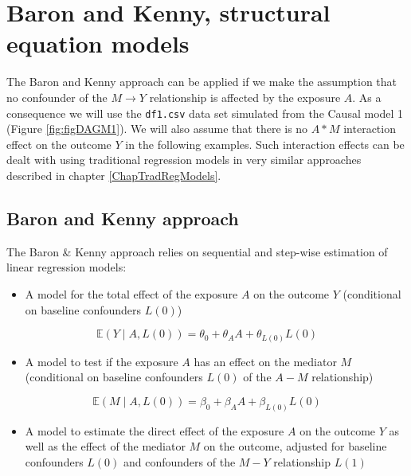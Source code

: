 \documentclass[
]{book}
\providecommand{\tightlist}{%
  \setlength{\itemsep}{0pt}\setlength{\parskip}{0pt}}
\begin{document}
\chapter{Baron and Kenny, structural equation models}\label{ChapBaronKennySem}

The Baron and Kenny approach can be applied if we make the assumption that no confounder of the \(M \rightarrow Y\) relationship is affected by the exposure \(A\). As a consequence we will use the \texttt{df1.csv} data set simulated from the Causal model 1 (Figure \ref{fig:figDAGM1}). We will also assume that there is no \(A \ast M\) interaction effect on the outcome \(Y\) in the following examples. Such interaction effects can be dealt with using traditional regression models in very similar approaches described in chapter \ref{ChapTradRegModels}.

\section{Baron and Kenny approach}\label{baron-and-kenny-approach}

The Baron \& Kenny approach relies on sequential and step-wise estimation of linear regression models:

\begin{itemize}
\tightlist
\item
  A model for the total effect of the exposure \(A\) on the outcome \(Y\) (conditional on baseline confounders \(L(0)\))
\end{itemize}

\begin{equation*}
    \mathbb{E}(Y \mid A,L(0)) = \theta_0 + \theta_A A + \theta_{L(0)} L(0)
  \end{equation*}

\begin{itemize}
\tightlist
\item
  A model to test if the exposure \(A\) has an effect on the mediator \(M\) (conditional on baseline confounders \(L(0)\) of the \(A-M\) relationship)
\end{itemize}

\begin{equation*}
    \mathbb{E}(M \mid A,L(0)) = \beta_0 + \beta_A A + \beta_{L(0)} L(0)
  \end{equation*}

\begin{itemize}
\tightlist
\item
  A model to estimate the direct effect of the exposure \(A\) on the outcome \(Y\) as well as the effect of the mediator \(M\) on the outcome, adjusted for baseline confounders \(L(0)\) and confounders of the \(M-Y\) relationship \(L(1)\)
\end{itemize}
\end{document}
